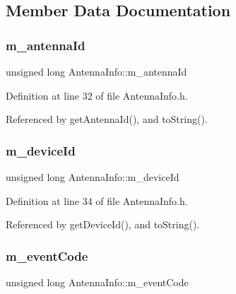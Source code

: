 \subsection{Member Data Documentation}
\mbox{\label{class_antenna_info_a7776748da0e4d9f4b39683066806a897}} 
\subsubsection{m\+\_\+antenna\+Id}
{\footnotesize\ttfamily unsigned long Antenna\+Info\+::m\+\_\+antenna\+Id\hspace{0.3cm}{\ttfamily [private]}}



Definition at line 32 of file Antenna\+Info.\+h.



Referenced by get\+Antenna\+Id(), and to\+String().

\mbox{\label{class_antenna_info_a006ef0511686a6874503ff398b6bf7e8}} 
\subsubsection{m\+\_\+device\+Id}
{\footnotesize\ttfamily unsigned long Antenna\+Info\+::m\+\_\+device\+Id\hspace{0.3cm}{\ttfamily [private]}}



Definition at line 34 of file Antenna\+Info.\+h.



Referenced by get\+Device\+Id(), and to\+String().

\mbox{\label{class_antenna_info_a90e054e1eb790e6b0096bf35a27bbd8e}} 
\subsubsection{m\+\_\+event\+Code}
{\footnotesize\ttfamily unsigned long Antenna\+Info\+::m\+\_\+event\+Code\hspace{0.3cm}{\ttfamily [private]}}



